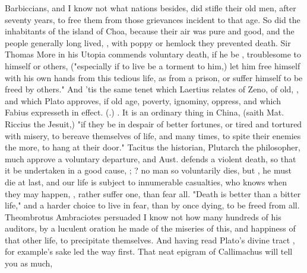 Barbiccians, and I know not what nations besides, did
stifle their old men, after seventy years, to free them from those grievances
incident to that age. So did the inhabitants of the island of Choa, because
their air was pure and good, and the people generally long lived,
, with poppy or hemlock they prevented death.
Sir Thomas More in his Utopia commends voluntary death, if he be , troublesome to himself or others,
("especially if to live be a torment to him,) let him free
himself with his own hands from this tedious life, as from a prison, or suffer
himself to be freed by others." And 'tis the same tenet
which Laertius relates of Zeno, of old, , and which Plato  approves,
if old age, poverty, ignominy, \etc{} oppress, and which Fabius expresseth in
effect. (.) . It is an ordinary thing in China, (saith Mat. Riccius the Jesuit,)
"if they be in despair of better fortunes, or tired and
tortured with misery, to bereave themselves of life, and many times, to spite
their enemies the more, to hang at their door." Tacitus the historian, Plutarch
the philosopher, much approve a voluntary departure, and Aust.
 defends a violent death, so
that it be undertaken in a good cause, 
; ? \etc{}
no man so voluntarily dies, but , he
must die at last, and our life is subject to innumerable casualties, who knows
when they may happen, , rather suffer one, than fear all. "Death
is better than a bitter life," 
and a harder choice to live in fear, than by once dying,
to be freed from all. Theombrotus Ambraciotes persuaded I know not how many
hundreds of his auditors, by a luculent oration he made of the miseries of
this, and happiness of that other life, to precipitate themselves. And having
read Plato's divine tract , for example's sake
led the way first. That neat epigram of Callimachus will tell you as much,

